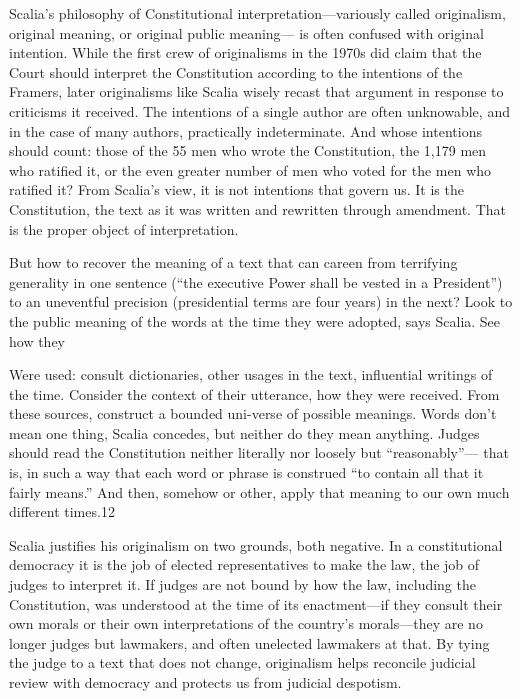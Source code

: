  \par 
Scalia’s philosophy of Constitutional interpretation—variously called originalism, original meaning, or original public meaning— is often confused with original intention. While the first crew of originalisms in the 1970s did claim that the Court should interpret the Constitution according to the intentions of the Framers, later originalisms like Scalia wisely recast that argument in response to criticisms it received. The intentions of a single author are often unknowable, and in the case of many authors, practically indeterminate. And whose intentions should count: those of the {\color{blue}55} men who wrote the Constitution, the 1,179 men who ratified it, or the even greater number of men who voted for the men who ratified it? From Scalia’s view, it is not intentions that govern us. It is the Constitution, the text as it was written and rewritten through amendment. That is the proper object of interpretation.
 \par 
But how to recover the meaning of a text that can careen from terrifying generality in one sentence (“the executive Power shall be vested in a President”) to an uneventful precision (presidential terms are four years) in the next? Look to the public meaning of the words at the time they were adopted, says Scalia. See how they
 \par 
Were used: consult dictionaries, other usages in the text, influential writings of the time. Consider the context of their utterance, how they were received. From these sources, construct a bounded uni-verse of possible meanings. Words don’t mean one thing, Scalia concedes, but neither do they mean anything. Judges should read the Constitution neither literally nor loosely but “reasonably”— that is, in such a way that each word or phrase is construed “to contain all that it fairly means.” And then, somehow or other, apply that meaning to our own much different times.{\color{blue}12}
 \par 
Scalia justifies his originalism on two grounds, both negative. In a constitutional democracy it is the job of elected representatives to make the law, the job of judges to interpret it. If judges are not bound by how the law, including the Constitution, was understood at the time of its enactment—if they consult their own morals or their own interpretations of the country’s morals—they are no longer judges but lawmakers, and often unelected lawmakers at that. By tying the judge to a text that does not change, originalism helps reconcile judicial review with democracy and protects us from judicial despotism.
